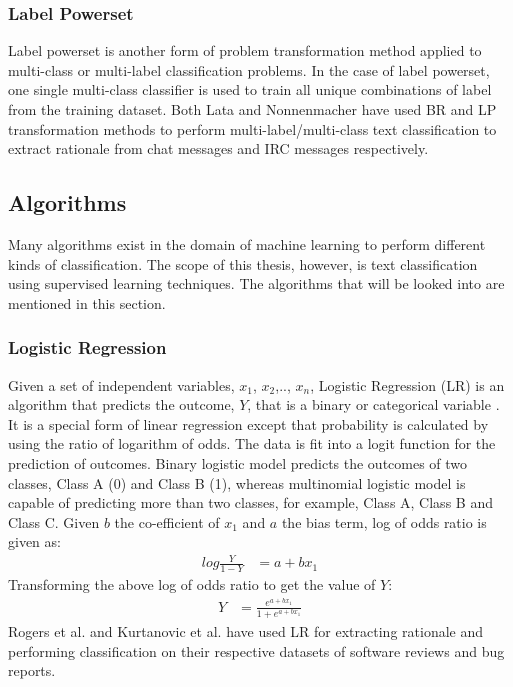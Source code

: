 \documentclass[a4paper,12pt,twoside]{report}
\begin{document}
\subsubsection{Label Powerset} 
Label powerset is another form of problem transformation method applied to multi-class or multi-label classification problems. In the case of label powerset, one single multi-class classifier is used to train all unique combinations of label from the training dataset.
\bigbreak
Both Lata \cite{Lata2016} and Nonnenmacher\cite{Nonnenmacher2017} have used BR and LP transformation methods to perform multi-label/multi-class text classification to extract rationale from chat messages and IRC messages respectively. 

\subsection{Algorithms}
Many algorithms exist in the domain of machine learning to perform different kinds of classification. The scope of this thesis, however, is text classification using supervised learning techniques. The algorithms that will be looked into are mentioned in this section.

\subsubsection{Logistic Regression}
Given a set of independent variables, $x_1$, $x_2$,.., $x_n$, Logistic Regression (LR) is an algorithm that predicts the outcome, $Y$, that is a binary or categorical variable \cite{Peng2002}\cite{Strombergsson2009} . It is a special form of linear regression except that probability is calculated by using the ratio of logarithm of odds. The data is fit into a logit function for the prediction of outcomes. Binary logistic model predicts the outcomes of two classes, Class A (0) and Class B (1), whereas multinomial logistic model is capable of predicting more than two classes, for example, Class A, Class B and Class C\cite{Jurafsky2017}. 
\bigbreak
Given $b$ the co-efficient of $x_1$ and $a$ the bias term, log of odds ratio is given as:
\begin{align*}
log\frac{Y}{1-Y} &= a + bx_1
\end{align*}
\bigbreak
Transforming the above log of odds ratio to get the value of $Y$:
\begin{align*}
Y &=  \frac{e^{a + bx_1}}{1 + e^{a + bx_1}}
\end{align*}
\bigbreak
Rogers et al.\cite{Rogers2012} and Kurtanovic et al.\cite{Kurtanovic2017} have used LR for extracting rationale and performing classification on their respective datasets of software reviews and bug reports. 
\end{document}
